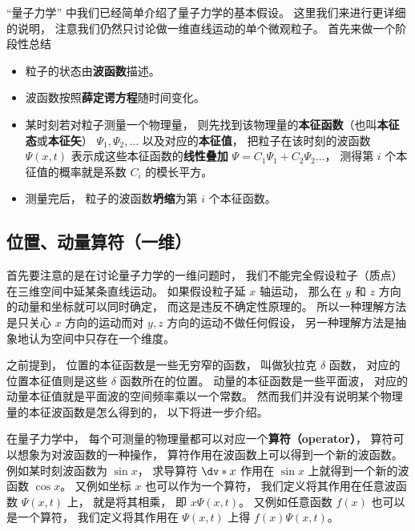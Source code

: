 


“量子力学” 中我们已经简单介绍了量子力学的基本假设。 这里我们来进行更详细的说明， 注意我们仍然只讨论做一维直线运动的单个微观粒子。 首先来做一个阶段性总结
\begin{itemize}
\item 粒子的状态由\textbf{波函数}描述。
\item 波函数按照\textbf{薛定谔方程}随时间变化。
\item 某时刻若对粒子测量一个物理量， 则先找到该物理量的\textbf{本征函数}（也叫\textbf{本征态}或\textbf{本征矢}） $\Psi_1, \Psi_2, \dots$ 以及对应的\textbf{本征值}， 把粒子在该时刻的波函数 $\Psi(x, t)$ 表示成这些本征函数的\textbf{线性叠加} $\Psi = C_1 \Psi_1 + C_2 \Psi_2\dots$， 测得第 $i$ 个本征值的概率就是系数 $C_i$ 的模长平方。
\item 测量完后， 粒子的波函数\textbf{坍缩}为第 $i$ 个本征函数。
\end{itemize}

\subsection{位置、动量算符（一维）}
首先要注意的是在讨论量子力学的一维问题时， 我们不能完全假设粒子（质点）在三维空间中延某条直线运动。 如果假设粒子延 $x$ 轴运动， 那么在 $y$ 和 $z$ 方向的动量和坐标就可以同时确定， 而这是违反不确定性原理的。 所以一种理解方法是只关心 $x$ 方向的运动而对 $y,z$ 方向的运动不做任何假设， 另一种理解方法是抽象地认为空间中只存在一个维度。

之前提到， 位置的本征函数是一些无穷窄的函数， 叫做狄拉克 $\delta$ 函数， 对应的位置本征值则是这些 $\delta$ 函数所在的位置。 动量的本征函数是一些平面波， 对应的动量本征值就是平面波的空间频率乘以一个常数。 然而我们并没有说明某个物理量的本征波函数是怎么得到的， 以下将进一步介绍。

在量子力学中， 每个可测量的物理量都可以对应一个\textbf{算符（operator）}， 算符可以想象为对波函数的一种操作， 算符作用在波函数上可以得到一个新的波函数。 例如某时刻波函数为 $\sin x$， 求导算符 $\dv*{x}$ 作用在 $\sin x$ 上就得到一个新的波函数 $\cos x$。 又例如坐标 $x$ 也可以作为一个算符， 我们定义将其作用在任意波函数 $\Psi(x, t)$ 上， 就是将其相乘， 即 $x\Psi(x, t)$。 又例如任意函数 $f(x)$ 也可以是一个算符， 我们定义将其作用在 $\Psi(x, t)$ 上得 $f(x)\Psi(x, t)$。

